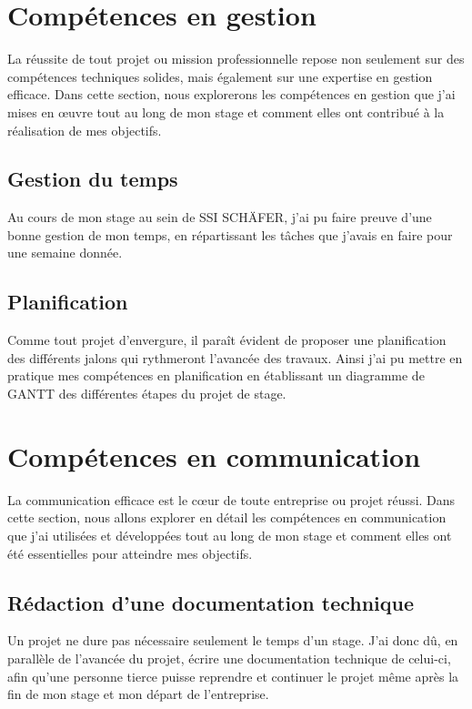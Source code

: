 \documentclass[a4paper, 12pt, french]{article}
\begin{document}
			\section{Compétences en gestion}
				La réussite de tout projet ou mission professionnelle repose non seulement sur des compétences techniques solides, mais également sur une expertise en gestion efficace. Dans cette section, nous explorerons les compétences en gestion que j'ai mises en œuvre tout au long de mon stage et comment elles ont contribué à la réalisation de mes objectifs.
				
				\subsection{Gestion du temps}
					Au cours de mon stage au sein de SSI SCHÄFER, j'ai pu faire preuve d'une bonne gestion de mon temps, en répartissant les tâches que j'avais en faire pour une semaine donnée.	

				\subsection{Planification}
					Comme tout projet d'envergure, il paraît évident de proposer une planification des différents jalons qui rythmeront l'avancée des travaux. Ainsi j'ai pu mettre en pratique mes compétences en planification en établissant un diagramme de GANTT des différentes étapes du projet de stage.
			
			\section{Compétences en communication}
				La communication efficace est le cœur de toute entreprise ou projet réussi. Dans cette section, nous allons explorer en détail les compétences en communication que j'ai utilisées et développées tout au long de mon stage et comment elles ont été essentielles pour atteindre mes objectifs.
				
				\subsection{Rédaction d'une documentation technique}			
					Un projet ne dure pas nécessaire seulement le temps d'un stage. J'ai donc dû, en parallèle de l'avancée du projet, écrire une documentation technique de celui-ci, afin qu'une personne tierce puisse reprendre et continuer le projet même après la fin de mon stage et mon départ de l'entreprise.
			
\end{document}
